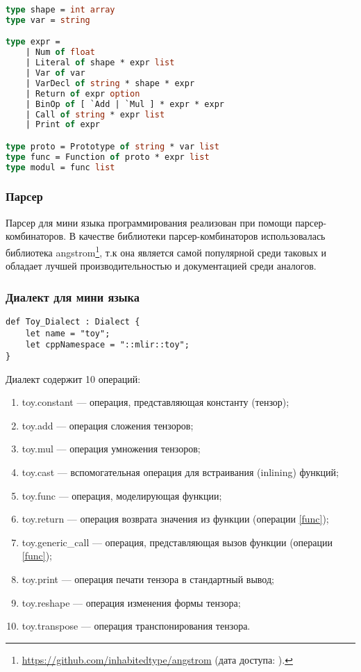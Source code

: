 \begin{lstlisting}[caption={AST языка.}, language=Caml, frame=single]
type shape = int array
type var = string

type expr =
    | Num of float
    | Literal of shape * expr list
    | Var of var
    | VarDecl of string * shape * expr
    | Return of expr option
    | BinOp of [ `Add | `Mul ] * expr * expr
    | Call of string * expr list
    | Print of expr

type proto = Prototype of string * var list
type func = Function of proto * expr list
type modul = func list
\end{lstlisting}

\subsubsection{Парсер}

Парсер для мини языка программирования реализован при помощи парсер-комбинаторов. В качестве библиотеки парсер-комбинаторов использовалась библиотека angstrom\footnote{\url{https://github.com/inhabitedtype/angstrom} (дата доступа:   ).}, т.к она является самой популярной среди таковых и обладает лучшей производительностью и документацией среди аналогов.

\subsubsection{Диалект для мини языка}

\begin{lstlisting}[caption={Определение диалекта.}, frame=single]
def Toy_Dialect : Dialect {
    let name = "toy";
    let cppNamespace = "::mlir::toy";
}
\end{lstlisting}

\label{toy_ops} Диалект содержит 10 операций:
\begin{enumerate}
	\item toy.constant --- операция, представляющая константу (тензор);
	\item toy.add --- операция сложения тензоров;
	\item toy.mul --- операция умножения тензоров;
	\item toy.cast --- вспомогательная операция для встраивания (inlining) функций;
	\item \label{func} toy.func --- операция, моделирующая функции;
	\item toy.return --- операция возврата значения из функции (операции \ref{func});
	\item toy.generic\_call --- операция, представляющая вызов функции (операции \ref{func});
	\item toy.print --- операция печати тензора в стандартный вывод;
	\item toy.reshape --- операция изменения формы тензора;
	\item toy.transpose --- операция транспонирования тензора.
\end{enumerate}

